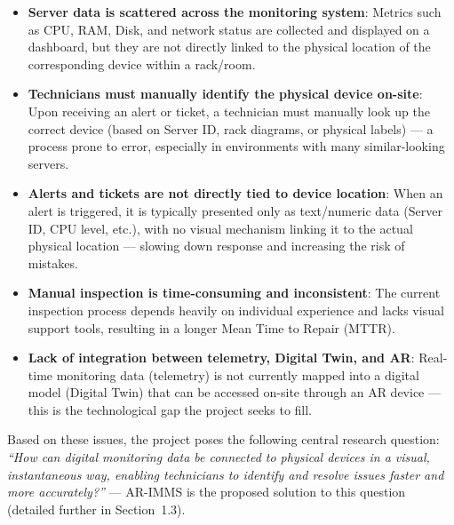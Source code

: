 \documentclass[12pt]{article}
\begin{document}
\begin{itemize}[leftmargin=*]
    \item \textbf{Server data is scattered across the monitoring system}: Metrics such as CPU, RAM, Disk, and network status are collected and displayed on a dashboard, but they are not directly linked to the physical location of the corresponding device within a rack/room.

    \item \textbf{Technicians must manually identify the physical device on-site}: Upon receiving an alert or ticket, a technician must manually look up the correct device (based on Server ID, rack diagrams, or physical labels) --- a process prone to error, especially in environments with many similar-looking servers.

    \item \textbf{Alerts and tickets are not directly tied to device location}: When an alert is triggered, it is typically presented only as text/numeric data (Server ID, CPU level, etc.), with no visual mechanism linking it to the actual physical location --- slowing down response and increasing the risk of mistakes.

    \item \textbf{Manual inspection is time-consuming and inconsistent}: The current inspection process depends heavily on individual experience and lacks visual support tools, resulting in a longer Mean Time to Repair (MTTR).

    \item \textbf{Lack of integration between telemetry, Digital Twin, and AR}: Real-time monitoring data (telemetry) is not currently mapped into a digital model (Digital Twin) that can be accessed on-site through an AR device --- this is the technological gap the project seeks to fill.
\end{itemize}

Based on these issues, the project poses the following central research question: \textit{``How can digital monitoring data be connected to physical devices in a visual, instantaneous way, enabling technicians to identify and resolve issues faster and more accurately?''} --- AR-IMMS is the proposed solution to this question (detailed further in Section~1.3).
\end{document}
